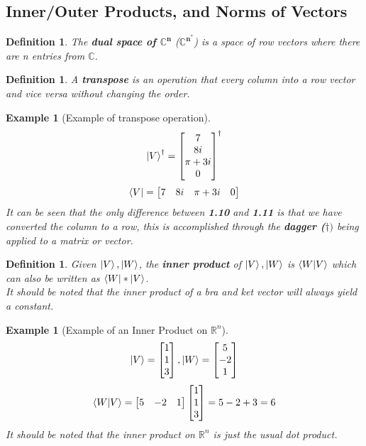 \documentclass[12pt]{article}
\theoremstyle{plain}
\theoremstyle{nonumberplain}
\theoremstyle{plain}
\newtheorem{definition}[lemma]{Definition}
\newtheorem{example}[lemma]{Example}
\theoremstyle{nonumberplain}
\newcommand\1{{\bf 1}}
\newcommand{\bmat}[1]{\begin{bmatrix*} #1 \end{bmatrix*}} %
\newcommand{\R}{\mathbb{R}} %
\newcommand{\C}{\mathbb{C}} %
\newcommand{\<}{\left\langle}
\renewcommand{\>}{\right\rangle}
\begin{document}
\subsection{Inner/Outer Products, and Norms of Vectors}
\begin{definition}
The \textbf{dual space of $\mathbf{\C^n}$} ($\mathbf{\C^{n^*}}$) is a space of row vectors where there are n entries from $\C$. 
\end{definition}
\begin{definition}
A \textbf{transpose} is an operation that every column into a row vector and vice versa without changing the order.
\end{definition}
\begin{example}[Example of transpose operation]
\begin{equation}
\ket{V}^\dagger = \bmat{7\\ 8i\\ \pi+3i\\ 0}^\dagger
\end{equation}
\begin{equation}
\bra{V} = \bmat{7& 8i& \pi+3i& 0}
\end{equation}
It can be seen that the only difference between \textbf{1.10} and \textbf{1.11} is that we have converted the column to a row, this is accomplished through the \textbf{dagger ($\mathbf{\dagger)}$} being applied to a matrix or vector.
\end{example}

\begin{definition}
Given $\ket{V}, \ket{W}$, the \textbf{inner product} of $\ket{V}, \ket{W}$ is $\braket{W|V}$ which can also be written as ${\bra{W}} * \ket{V}$. \\ \textit{It should be noted that the inner product of a bra and ket vector will always yield a constant}.
\end{definition}

\begin{example}[Example of an Inner Product on $\R^n$]
\begin{equation}
\ket{V} = \bmat{1\\ 1\\ 3}, \ket{W} = \bmat{5\\ -2\\ 1}
\end{equation}
\begin{equation}
\braket{W|V} = \bmat{5& -2& 1}\bmat{1\\ 1\\ 3} = 5 - 2 + 3 = 6
\end{equation}
\textit{It should be noted that the inner product on $\R^n$ is just the usual dot product.}
\end{example}
\end{document}
